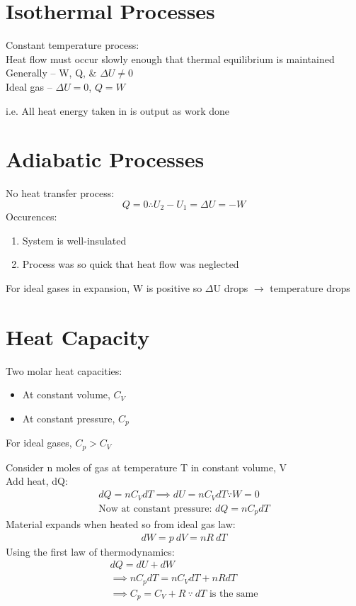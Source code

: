 \documentclass[a4paper, 11pt, fleqn, normalem]{report}
\begin{document}
\section{Isothermal Processes}
Constant temperature process: \\
Heat flow must occur slowly enough that thermal equilibrium is maintained \\
Generally -- W, Q, \& ${\Delta}U \neq 0$ \\
Ideal gas -- ${\Delta}U = 0$, $Q = W$

i.e. All heat energy taken in is output as work done

\section{Adiabatic Processes}
No heat transfer process:
\vspace{-10pt}
\begin{equation*}
	Q = 0 \therefore U_{2} - U_{1} = {\Delta}U = -W
\end{equation*}
Occurences:
\begin{enumerate}
	\item System is well-insulated
	\item Process was so quick that heat flow was neglected
\end{enumerate}
For ideal gases in expansion, W is positive so $\Delta$U drops $\rightarrow$ temperature drops

\section{Heat Capacity}
Two molar heat capacities:
\begin{itemize}
	\item[] At constant volume, $C_{V}$
	\item[] At constant pressure, $C_{p}$
\end{itemize}
For ideal gases, $C_{p} > C_{V}$

Consider n moles of gas at temperature T in constant volume, V \\
Add heat, dQ:
\begin{gather*}
	dQ = nC_{V}dT \implies dU = nC_{V}dT \because W = 0 \\
	\text{Now at constant pressure: } dQ = nC_{p}dT
\end{gather*}
Material expands when heated so from ideal gas law:
\begin{gather*}
	dW = p\:dV = nR\:dT
\end{gather*}
Using the first law of thermodynamics:
\begin{gather*}
	dQ = dU + dW \\
	\implies nC_{p}dT = nC_{V}dT + nRdT \\
	\implies C_{p} = C_{V} + R ~\because~ dT \text{ is the same}
\end{gather*}
\end{document}
